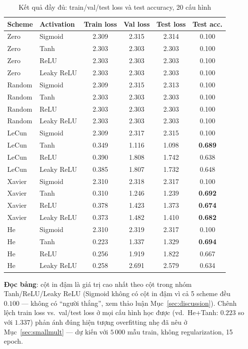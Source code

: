 \documentclass[12pt,a4paper]{article}
\begin{document}
\begin{table}[htbp]
\centering
\caption{Kết quả đầy đủ: train/val/test loss và test accuracy, 20 cấu hình}
\small
\begin{tabular}{@{}llcccc@{}}
\toprule
\textbf{Scheme} & \textbf{Activation} & \textbf{Train loss} & \textbf{Val loss} & \textbf{Test loss} & \textbf{Test acc.} \\
\midrule
Zero & Sigmoid & 2.309 & 2.315 & 2.314 & 0.100 \\
Zero & Tanh & 2.303 & 2.303 & 2.303 & 0.100 \\
Zero & ReLU & 2.303 & 2.303 & 2.303 & 0.100 \\
Zero & Leaky ReLU & 2.303 & 2.303 & 2.303 & 0.100 \\
\addlinespace
Random & Sigmoid & 2.309 & 2.315 & 2.313 & 0.100 \\
Random & Tanh & 2.303 & 2.303 & 2.303 & 0.100 \\
Random & ReLU & 2.303 & 2.303 & 2.303 & 0.100 \\
Random & Leaky ReLU & 2.303 & 2.303 & 2.303 & 0.100 \\
\addlinespace
LeCun & Sigmoid & 2.309 & 2.317 & 2.315 & 0.100 \\
LeCun & Tanh & 0.349 & 1.116 & 1.098 & \textbf{0.689} \\
LeCun & ReLU & 0.390 & 1.808 & 1.742 & 0.638 \\
LeCun & Leaky ReLU & 0.385 & 1.807 & 1.732 & 0.648 \\
\addlinespace
Xavier & Sigmoid & 2.310 & 2.318 & 2.317 & 0.100 \\
Xavier & Tanh & 0.310 & 1.246 & 1.239 & \textbf{0.692} \\
Xavier & ReLU & 0.378 & 1.423 & 1.373 & \textbf{0.674} \\
Xavier & Leaky ReLU & 0.373 & 1.482 & 1.410 & \textbf{0.682} \\
\addlinespace
He & Sigmoid & 2.310 & 2.319 & 2.317 & 0.100 \\
He & Tanh & 0.223 & 1.337 & 1.329 & \textbf{0.694} \\
He & ReLU & 0.256 & 1.919 & 1.822 & 0.667 \\
He & Leaky ReLU & 0.258 & 2.691 & 2.579 & 0.634 \\
\bottomrule
\end{tabular}
\label{tab:fulltable}
\end{table}

\textbf{Đọc bảng}: cột in đậm là giá trị cao nhất theo cột trong nhóm
Tanh/ReLU/Leaky ReLU (Sigmoid không có cột in đậm vì cả 5 scheme đều
$0.100$ --- không có ``người thắng'', xem thảo luận Mục~\ref{sec:discussion}).
Chênh lệch train loss vs.\ val/test loss ở mọi cấu hình học được (vd.\
He+Tanh: $0.223$ so với $1.337$) phản ánh đúng hiện tượng overfitting
nhẹ đã nêu ở Mục~\ref{sec:smallmult} --- dự kiến với $5\,000$ mẫu train,
không regularization, 15 epoch.
\end{document}
